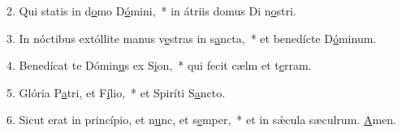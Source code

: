 2. Qui statis in d\uline{o}mo D\uline{ó}mini,~* in átriis domus Di n\uline{o}stri.\par 
3. In nóctibus extóllite manus v\uline{e}stras in s\uline{a}ncta,~* et benedícte D\uline{ó}minum.\par 
4. Benedícat te Dómin\uline{u}s ex S\uline{i}on,~* qui fecit cælm et t\uline{e}rram.\par 
5. Glória P\uline{a}tri, et F\uline{í}lio,~* et Spiríti S\uline{a}ncto.\par 
6. Sicut erat in princípio, et n\uline{u}nc, et s\uline{e}mper,~* et in sǽcula sæculrum. \uline{A}men.\par 
